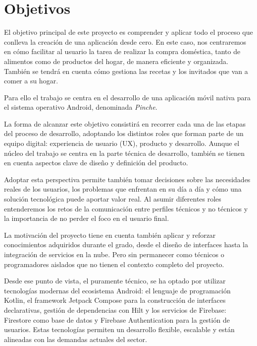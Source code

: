 \cleardoublepage %
\chapter{Objetivos} %
\label{chap:objetivos} %

El objetivo principal de este proyecto es comprender y aplicar todo el proceso que conlleva la creación de una aplicación desde cero. En este caso, nos centraremos en cómo facilitar al usuario la tarea de realizar la compra doméstica, tanto de alimentos como de productos del hogar, de manera eficiente y organizada. También se tendrá en cuenta cómo gestiona las recetas y los invitados que van a comer a su hogar.

Para ello el trabajo se centra en el desarrollo de una aplicación móvil nativa para el sistema operativo Android, denominada \textit{Pinche}.

La forma de alcanzar este objetivo consistirá en recorrer cada una de las etapas del proceso de desarrollo, adoptando los distintos roles que forman parte de un equipo digital: experiencia de usuario (UX), producto y desarrollo. Aunque el núcleo del trabajo se centra en la parte técnica de desarrollo, también se tienen en cuenta aspectos clave de diseño y definición del producto.

Adoptar esta perspectiva permite también tomar decisiones sobre las necesidades reales de los usuarios, los problemas que enfrentan en su día a día y cómo una solución tecnológica puede aportar valor real. Al asumir diferentes roles entenderemos los retos de la comunicación entre perfiles técnicos y no técnicos y la importancia de no perder el foco en el usuario final.

La motivación del proyecto tiene en cuenta también aplicar y reforzar conocimientos adquiridos durante el grado, desde el diseño de interfaces hasta la integración de servicios en la nube. Pero sin permanecer como técnicos o programadores aislados que no tienen el contexto completo del proyecto.

Desde ese punto de vista, el puramente técnico, se ha optado por utilizar tecnologías modernas del ecosistema Android: el lenguaje de programación Kotlin, el framework Jetpack Compose para la construcción de interfaces declarativas, gestión de dependencias con Hilt y los servicios de Firebase: Firestore como base de datos y Firebase Authentication para la gestión de usuarios. Estas tecnologías permiten un desarrollo flexible, escalable y están alineadas con las demandas actuales del sector.

